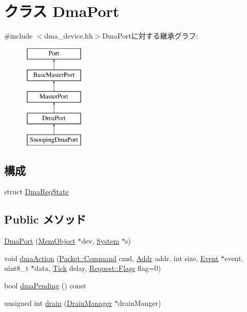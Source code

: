\hypertarget{classDmaPort}{
\section{クラス DmaPort}
\label{classDmaPort}
}


{\ttfamily \#include $<$dma\_\-device.hh$>$}DmaPortに対する継承グラフ:\begin{figure}[H]
\begin{center}
\leavevmode
\includegraphics[height=5cm]{classDmaPort}
\end{center}
\end{figure}
\subsection*{構成}
\begin{DoxyCompactItemize}
\item 
struct \hyperlink{structDmaPort_1_1DmaReqState}{DmaReqState}
\end{DoxyCompactItemize}
\subsection*{Public メソッド}
\begin{DoxyCompactItemize}
\item 
\hyperlink{classDmaPort_a7e3134f5a5a31bf28df04f0d6223ac3b}{DmaPort} (\hyperlink{classMemObject}{MemObject} $\ast$dev, \hyperlink{classSystem}{System} $\ast$s)
\item 
void \hyperlink{classDmaPort_ac9a04fe85b8cb0292631680073eddb86}{dmaAction} (\hyperlink{classMemCmd_a2afce0a47a93eee73a314d53e4890153}{Packet::Command} cmd, \hyperlink{base_2types_8hh_af1bb03d6a4ee096394a6749f0a169232}{Addr} addr, int size, \hyperlink{classEvent}{Event} $\ast$event, uint8\_\-t $\ast$data, \hyperlink{base_2types_8hh_a5c8ed81b7d238c9083e1037ba6d61643}{Tick} delay, \hyperlink{classFlags}{Request::Flags} flag=0)
\item 
bool \hyperlink{classDmaPort_a481b9352c138101d0f84f163a760c6e5}{dmaPending} () const 
\item 
unsigned int \hyperlink{classDmaPort_a6bf479c521c7c3eb473822d953275b26}{drain} (\hyperlink{classDrainManager}{DrainManager} $\ast$drainManger)
\end{DoxyCompactItemize}
